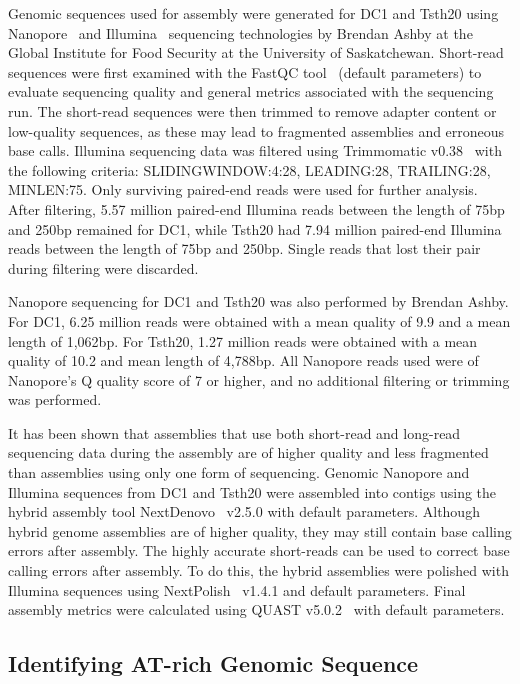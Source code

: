 Genomic sequences used for assembly were generated for DC1 and Tsth20 using Nanopore~\cite{wang2021a} and Illumina~\cite{bennett2004a} sequencing technologies by Brendan Ashby at the Global Institute for Food Security at the University of Saskatchewan. Short-read sequences were first examined with the FastQC tool~\cite{andrews} (default parameters) to evaluate sequencing quality and general metrics associated with the sequencing run. The short-read sequences were then trimmed to remove adapter content or low-quality sequences, as these may lead to fragmented assemblies and erroneous base calls. Illumina sequencing data was filtered using Trimmomatic v0.38~\cite{bolger2014a} with the following criteria: SLIDINGWINDOW:4:28, LEADING:28, TRAILING:28, MINLEN:75. Only surviving paired-end reads were used for further analysis. After filtering, 5.57 million paired-end Illumina reads between the length of 75bp and 250bp remained for DC1, while Tsth20 had 7.94 million paired-end Illumina reads between the length of 75bp and 250bp. Single reads that lost their pair during filtering were discarded.

Nanopore sequencing for DC1 and Tsth20 was also performed by Brendan Ashby. For DC1, 6.25 million reads were obtained with a mean quality of 9.9 and a mean length of 1,062bp. For Tsth20, 1.27 million reads were obtained with a mean quality of 10.2 and mean length of 4,788bp. All Nanopore reads used were of Nanopore's Q quality score of 7 or higher, and no additional filtering or trimming was performed.

It has been shown that assemblies that use both short-read and long-read sequencing data during the assembly are of higher quality and less fragmented than assemblies using only one form of sequencing. Genomic Nanopore and Illumina sequences from DC1 and Tsth20 were assembled into contigs using the hybrid assembly tool NextDenovo~\cite{hu2024a} v2.5.0 with default parameters. Although hybrid genome assemblies are of higher quality, they may still contain base calling errors after assembly. The highly accurate short-reads can be used to correct base calling errors after assembly. To do this, the hybrid assemblies were polished with Illumina sequences using NextPolish~\cite{hu2020a} v1.4.1 and default parameters. Final assembly metrics were calculated using QUAST v5.0.2~\cite{gurevich2013a} with default parameters.

\subsection{Identifying AT-rich Genomic Sequence}\label{met:atrich}

